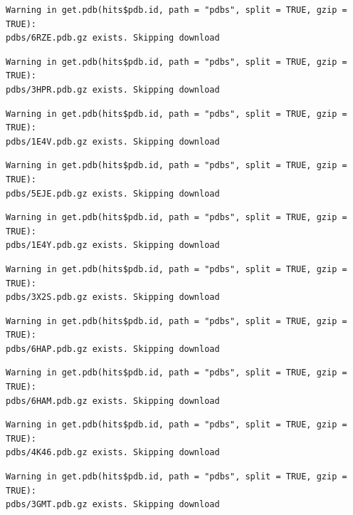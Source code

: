 \documentclass[
  letterpaper,
  DIV=11,
  numbers=noendperiod]{scrartcl}
\begin{document}
\begin{verbatim}
Warning in get.pdb(hits$pdb.id, path = "pdbs", split = TRUE, gzip = TRUE):
pdbs/6RZE.pdb.gz exists. Skipping download
\end{verbatim}

\begin{verbatim}
Warning in get.pdb(hits$pdb.id, path = "pdbs", split = TRUE, gzip = TRUE):
pdbs/3HPR.pdb.gz exists. Skipping download
\end{verbatim}

\begin{verbatim}
Warning in get.pdb(hits$pdb.id, path = "pdbs", split = TRUE, gzip = TRUE):
pdbs/1E4V.pdb.gz exists. Skipping download
\end{verbatim}

\begin{verbatim}
Warning in get.pdb(hits$pdb.id, path = "pdbs", split = TRUE, gzip = TRUE):
pdbs/5EJE.pdb.gz exists. Skipping download
\end{verbatim}

\begin{verbatim}
Warning in get.pdb(hits$pdb.id, path = "pdbs", split = TRUE, gzip = TRUE):
pdbs/1E4Y.pdb.gz exists. Skipping download
\end{verbatim}

\begin{verbatim}
Warning in get.pdb(hits$pdb.id, path = "pdbs", split = TRUE, gzip = TRUE):
pdbs/3X2S.pdb.gz exists. Skipping download
\end{verbatim}

\begin{verbatim}
Warning in get.pdb(hits$pdb.id, path = "pdbs", split = TRUE, gzip = TRUE):
pdbs/6HAP.pdb.gz exists. Skipping download
\end{verbatim}

\begin{verbatim}
Warning in get.pdb(hits$pdb.id, path = "pdbs", split = TRUE, gzip = TRUE):
pdbs/6HAM.pdb.gz exists. Skipping download
\end{verbatim}

\begin{verbatim}
Warning in get.pdb(hits$pdb.id, path = "pdbs", split = TRUE, gzip = TRUE):
pdbs/4K46.pdb.gz exists. Skipping download
\end{verbatim}

\begin{verbatim}
Warning in get.pdb(hits$pdb.id, path = "pdbs", split = TRUE, gzip = TRUE):
pdbs/3GMT.pdb.gz exists. Skipping download
\end{verbatim}
\end{document}
